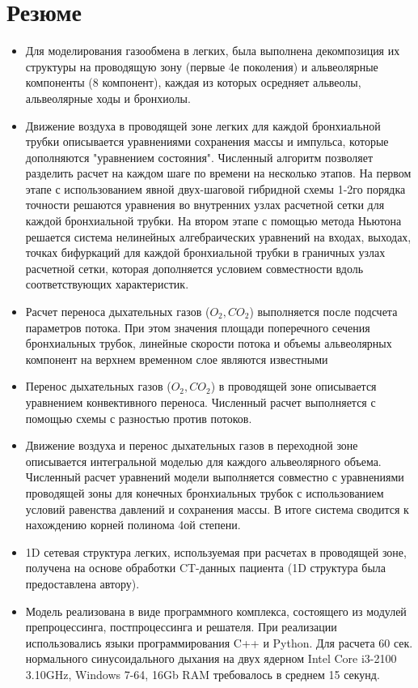 \section{Резюме}
\begin{itemize}
\item
Для моделирования газообмена в легких, была выполнена декомпозиция их
структуры на проводящую зону (первые 4е поколения) и альвеолярные компоненты (8 компонент), каждая из которых осредняет альвеолы, альвеолярные ходы и бронхиолы.
\item
Движение воздуха в проводящей зоне легких  для каждой бронхиальной трубки описывается уравнениями сохранения массы и импульса, которые дополняются "уравнением состояния". Численный алгоритм позволяет разделить расчет на каждом шаге по времени на несколько этапов. На первом этапе с использованием явной двух-шаговой гибридной схемы 1-2го порядка точности решаются уравнения во внутренних узлах расчетной сетки для каждой бронхиальной трубки. На втором этапе с помощью метода Ньютона решается система нелинейных алгебраических уравнений на входах, выходах, точках бифуркаций для каждой бронхиальной трубки в граничных узлах расчетной сетки, которая дополняется условием совместности вдоль соответствующих характеристик.
\item
Расчет переноса дыхательных газов ($O_{2}, CO_{2}$) выполняется после подсчета параметров потока. При этом значения площади поперечного сечения бронхиальных трубок, линейные скорости потока и объемы альвеолярных компонент на верхнем временном слое являются известными
\item
Перенос дыхательных газов ($O_{2}, CO_{2}$) в проводящей зоне описывается уравнением конвективного переноса. Численный расчет выполняется с помощью схемы с разностью против потоков. 
\item
Движение воздуха и перенос дыхательных газов в переходной зоне описывается интегральной моделью для каждого альвеолярного объема. Численный расчет уравнений модели выполняется совместно с уравнениями проводящей зоны для конечных бронхиальных трубок с использованием условий равенства давлений и сохранения массы. В итоге система сводится к нахождению корней полинома 4ой степени.  
\item 
1D сетевая структура легких, используемая при расчетах в проводящей зоне, получена на основе обработки CT-данных пациента (1D структура была предоставлена автору).
\item
Модель реализована в виде программного комплекса, состоящего из модулей препроцессинга, постпроцессинга и решателя. При реализации использовались языки программирования C++ и Python.  Для расчета 60 сек. нормального синусоидального дыхания на двух ядерном Intel Core i3-2100 3.10GHz, Windows 7-64, 16Gb RAM требовалось в среднем 15 секунд.
\end{itemize}